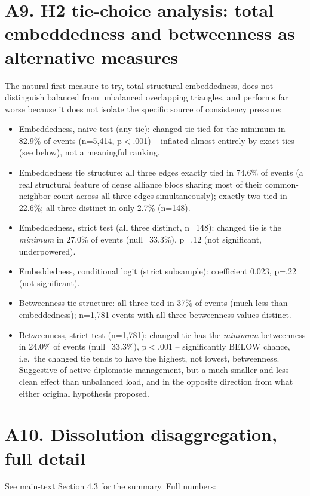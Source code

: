 \documentclass[Afour,sageh,times,doublespace]{sagej}
\begin{document}
\section*{A9. H2 tie-choice analysis: total embeddedness and betweenness as alternative measures}

The natural first measure to try, total structural embeddedness, does not distinguish balanced from unbalanced overlapping triangles, and performs far worse because it does not isolate the specific source of consistency pressure:

\begin{itemize}
\item Embeddedness, naive test (any tie): changed tie tied for the minimum in 82.9\% of events (n=5,414, p$<$.001) -- inflated almost entirely by exact ties (see below), not a meaningful ranking.
\item Embeddedness tie structure: all three edges exactly tied in 74.6\% of events (a real structural feature of dense alliance blocs sharing most of their common-neighbor count across all three edges simultaneously); exactly two tied in 22.6\%; all three distinct in only 2.7\% (n=148).
\item Embeddedness, strict test (all three distinct, n=148): changed tie is the \emph{minimum} in 27.0\% of events (null=33.3\%), p=.12 (not significant, underpowered).
\item Embeddedness, conditional logit (strict subsample): coefficient 0.023, p=.22 (not significant).
\item Betweenness tie structure: all three tied in 37\% of events (much less than embeddedness); n=1,781 events with all three betweenness values distinct.
\item Betweenness, strict test (n=1,781): changed tie has the \emph{minimum} betweenness in 24.0\% of events (null=33.3\%), p$<$.001 -- significantly BELOW chance, i.e.\ the changed tie tends to have the highest, not lowest, betweenness. Suggestive of active diplomatic management, but a much smaller and less clean effect than unbalanced load, and in the opposite direction from what either original hypothesis proposed.
\end{itemize}

\section*{A10. Dissolution disaggregation, full detail}

See main-text Section 4.3 for the summary. Full numbers:
\end{document}
